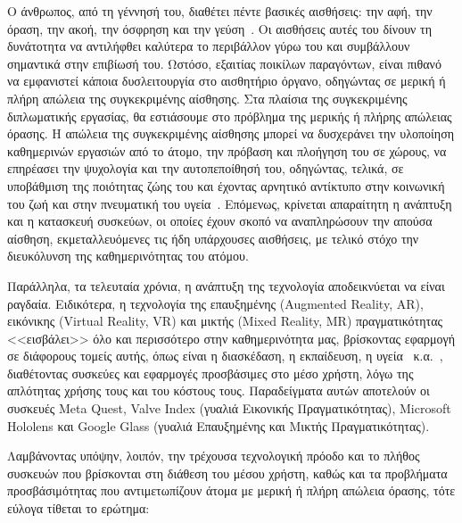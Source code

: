 
\setlength{\parindent}{24pt}
Ο άνθρωπος, από τη γέννησή του, διαθέτει πέντε βασικές αισθήσεις: την αφή, την όραση, την ακοή, την όσφρηση και την γεύση~\cite{bradford_2017_the}. Οι αισθήσεις αυτές του δίνουν τη δυνάτοτητα να αντιλήφθει καλύτερα το περιβάλλον γύρω του και συμβάλλουν σημαντικά στην επιβίωσή του. Ωστόσο, εξαιτίας ποικίλων παραγόντων, είναι πιθανό να εμφανιστεί κάποια δυσλειτουργία στο αισθητήριο όργανο, οδηγώντας σε μερική ή πλήρη απώλεια της συγκεκριμένης αίσθησης. Στα πλαίσια της συγκεκριμένης διπλωματικής εργασίας, θα εστιάσουμε στο πρόβλημα της μερικής ή πλήρης απώλειας όρασης. Η απώλεια της συγκεκριμένης αίσθησης μπορεί να δυσχεράνει την υλοποίηση καθημερινών εργασιών από το άτομο, την πρόβαση και πλοήγηση του σε χώρους, να επηρέασει την ψυχολογία και την αυτοπεποίθησή του, οδηγώντας, τελικά, σε υποβάθμιση της ποιότητας ζώης του και έχοντας αρνητικό αντίκτυπο στην κοινωνική του ζωή και στην πνευματική του υγεία~\cite{worldhealthorganization_2023_blindness}\cite{maaikelangelaan_2007_quality}. Επόμενως, κρίνεται απαραίτητη η ανάπτυξη και η κατασκευή συσκεύων, οι οποίες έχουν σκοπό να αναπληρώσουν την απούσα αίσθηση, εκμεταλλευόμενες τις ήδη υπάρχουσες αισθήσεις, με τελικό στόχο την διευκόλυνση της καθημερινότητας του ατόμου.

Παράλληλα, τα τελευταία χρόνια, η ανάπτυξη της τεχνολογία αποδεικνύεται να είναι ραγδαία. Ειδικότερα, η τεχνολογία της επαυξημένης (Augmented Reality, AR), εικόνικης (Virtual Reality, VR) και μικτής (Mixed Reality, MR) πραγματικότητας <<εισβάλει>> όλο και περισσότερο στην καθημερινότητα μας, βρίσκοντας εφαρμογή σε διάφορους τομείς αυτής, όπως είναι η διασκέδαση, η εκπαίδευση, η υγεία~\cite{morgan_2021_the} κ.α.~\cite{wikipediacontributors_2019_mixed}, διαθέτοντας συσκεύες και εφαρμογές προσβάσιμες στο μέσο χρήστη, λόγω της απλότητας χρήσης τους και του κόστους τους. Παραδείγματα αυτών αποτελούν οι συσκευές Meta Quest, Valve Index (γυαλιά Εικονικής Πραγματικότητας), Microsoft Hololens και Google Glass (γυαλιά Επαυξημένης και Μικτής Πραγματικότητας). %

Λαμβάνοντας υπόψην, λοιπόν, την τρέχουσα τεχνολογική πρόοδο και το πλήθος συσκευών που βρίσκονται στη διάθεση του μέσου χρήστη, καθώς και τα προβλήματα προσβάσιμότητας που αντιμετωπίζουν άτομα με μερική ή πλήρη απώλεια όρασης, τότε εύλογα τίθεται το ερώτημα:


